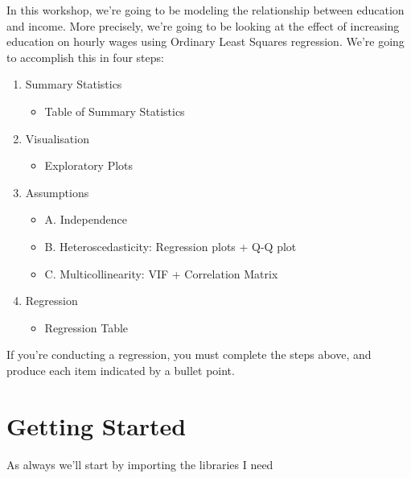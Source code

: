\documentclass[
  letterpaper,
  DIV=11,
  numbers=noendperiod]{scrreprt}
\providecommand{\tightlist}{%
  \setlength{\itemsep}{0pt}\setlength{\parskip}{0pt}}\usepackage{longtable,booktabs,array}
\begin{document}
In this workshop, we're going to be modeling the relationship between
education and income. More precisely, we're going to be looking at the
effect of increasing education on hourly wages using Ordinary Least
Squares regression. We're going to accomplish this in four steps:

\begin{enumerate}
\def\labelenumi{\arabic{enumi}.}
\tightlist
\item
  Summary Statistics

  \begin{itemize}
  \tightlist
  \item
    Table of Summary Statistics
  \end{itemize}
\item
  Visualisation

  \begin{itemize}
  \tightlist
  \item
    Exploratory Plots
  \end{itemize}
\item
  Assumptions

  \begin{itemize}
  \tightlist
  \item
    A. Independence
  \item
    B. Heteroscedasticity: Regression plots + Q-Q plot
  \item
    C. Multicollinearity: VIF + Correlation Matrix
  \end{itemize}
\item
  Regression

  \begin{itemize}
  \tightlist
  \item
    Regression Table
  \end{itemize}
\end{enumerate}

If you're conducting a regression, you must complete the steps above,
and produce each item indicated by a bullet point.

\hypertarget{getting-started-2}{%
\section{Getting Started}\label{getting-started-2}}

As always we'll start by importing the libraries I need
\end{document}
